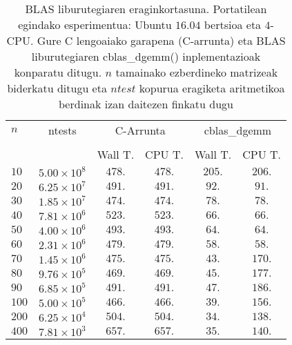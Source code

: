 \begin{table}
\caption[BLAS liburutegiaren eraginkortasuna.] 
{\small{BLAS liburutegiaren eraginkortasuna. Portatilean egindako esperimentua: Ubuntu $16.04$ bertsioa eta $4$-CPU. Gure C lengoaiako garapena (C-arrunta) eta BLAS liburutegiaren cblas\_dgemm() inplementazioak konparatu ditugu. $n$ tamainako ezberdineko matrizeak biderkatu ditugu eta $ntest$ kopurua eragiketa aritmetikoa berdinak izan daitezen finkatu dugu}}
\label{tab:blas}      
\centering
{%
\begin{tabular}{l c c c c c } 
 \hline
  $n$     & ntests        &  \multicolumn{2}{c}{C-Arrunta}  & \multicolumn{2}{c}{cblas\_dgemm} \\
 \\
          &                   & Wall T. & CPU T. &  Wall T. & CPU T. \\
 \hline         
 $10$  &   $5.00\times10^8$   & $478.$   & $478.$  & $205.$  & $206.$   \\ 
 $20$  &   $6.25\times10^7$   & $491.$   &  $491.$  & $92.$   & $91.$   \\ 
 $30$  &   $1.85\times10^7$   & $474.$    & $474.$ & $78.$   & $78.$   \\ 
 $40$  &   $7.81\times10^6$   & $523.$    & $523.$ & $66.$   & $66.$   \\ 
 $50$  &   $4.00\times10^6$   & $493.$    & $493.$ & $64.$   & $64.$   \\ 
 $60$  &   $2.31\times10^6$   & $479.$    & $479.$ & $58.$   & $58.$   \\ 
 $70$  &   $1.45\times10^6$   & $475.$    & $475.$ & $43.$   & $170.$   \\ 
 $80$  &   $9.76\times10^5$   & $469.$    & $469.$ & $45.$   & $177.$   \\ 
 $90$  &   $6.85\times10^5$   & $491.$    & $491.$ & $47.$   & $186.$   \\ 
 $100$ &   $5.00\times10^5$   & $466.$    & $466.$ & $39.$   & $156.$   \\ 
 $200$ &   $6.25\times10^4$   & $504.$    & $504.$ & $34.$   & $138.$   \\ 
 $400$ &   $7.81\times10^3$   & $657.$    & $657.$ & $35.$   & $140.$   \\ 
   \hline
 \end{tabular}}
\end{table}


